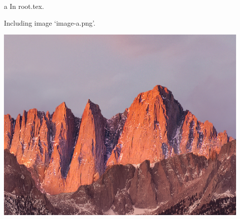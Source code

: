 \documentclass{article}
\begin{document}
a
In root.tex.

Including image `image-a.png'.

\includegraphics{images/image-a}


\end{document}
